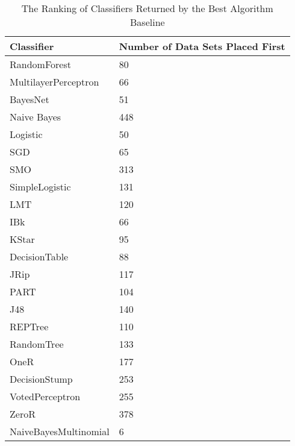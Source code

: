 \begin{table}[h]
\centering
	\begin{tabularx}{\textwidth}{X | X}
		Classifier				&	Number of Data Sets Placed First \\	\hline
		RandomForest				&	80								\\	\hline
		MultilayerPerceptron		&	66								\\	\hline
		BayesNet					&	51								\\	\hline
		Naive Bayes				&	448								\\	\hline	
		Logistic					&	50								\\	\hline	
		SGD						&	65								\\	\hline
		SMO						&	313								\\	\hline
		SimpleLogistic			&	131								\\	\hline
		LMT						&	120								\\	\hline	
		IBk						&	66								\\	\hline	
		KStar					&	95								\\	\hline	
		DecisionTable			&	88								\\	\hline
		JRip						&	117								\\	\hline
		PART						&	104								\\	\hline
		J48						&	140								\\	\hline	
		REPTree					&	110								\\	\hline
		RandomTree				&	133								\\	\hline	
		OneR						&	177								\\	\hline						
		DecisionStump			&	253								\\	\hline
		VotedPerceptron			&	255								\\	\hline	
		ZeroR					&	378								\\	\hline	
		NaiveBayesMultinomial	&	6								\\	\hline	
	\end{tabularx}
	\label{tab:bestAglorithmRanking}
	\caption{The Ranking of Classifiers Returned by the Best Algorithm Baseline}
\end{table}